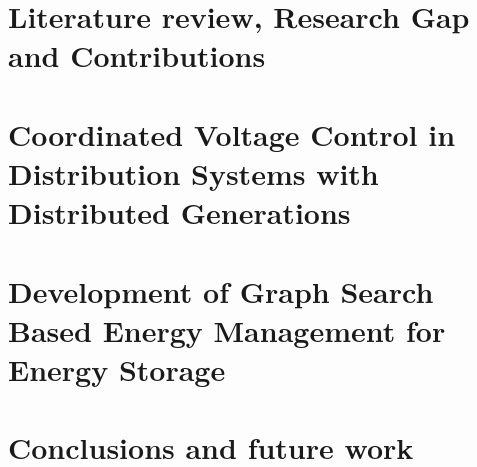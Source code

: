 \documentclass[11pt,expanded,copyright]{fsuthesis}
\begin{document}
\chapter{Literature review, Research Gap and Contributions}


\chapter{Coordinated Voltage Control in Distribution
Systems with Distributed Generations} \label{CVC}


\chapter{Development of Graph Search Based Energy Management for Energy Storage} \label{A8_cahp}



\chapter{Conclusions and future work}



\end{document}

